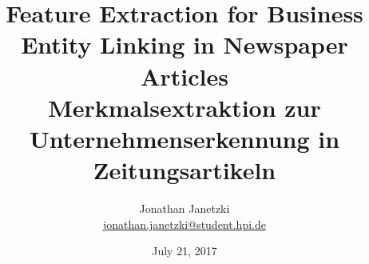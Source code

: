 \documentclass[
        a4paper,     %
        titlepage,   %
        parskip      %
        ]{scrartcl} %
\title{Feature Extraction for Business Entity Linking in Newspaper Articles
\\ \bigskip 
\large{Merkmalsextraktion zur Unternehmenserkennung in Zeitungsartikeln}}
\author{Jonathan Janetzki\\{\small{\url{jonathan.janetzki@student.hpi.de}}}}
\date{July 21, 2017}
\begin{document}
\maketitle

\newpage

\newpage
{\small\tableofcontents}
\newpage

\newpage

\newpage

\newpage

\newpage

\newpage

\newpage

\newpage

\newpage

\end{document}
